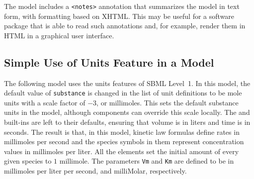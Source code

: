 \documentclass[10pt]{cekarticle}
\newcommand{\changed}[1]{\textcolor{BrickRed}{#1}}
\begin{document}
The model includes a \texttt{<notes>} annotation that summarizes the model
in text form, with formatting based on XHTML.  This may be useful for a
software package that is able to read such annotations and, for example,
render them in HTML in a graphical user interface.


\subsection{Simple Use of Units Feature in a Model}
\label{apdx:units-eg}

The following model uses the units features of SBML Level~1.  In this
model, the default value of \texttt{substance} is changed in the list of
unit definitions to be mole units with a scale factor of $-3$, or
millimoles.  This sets the default substance units in the model,
\changed{although} components can override this scale locally.  The
 and  built-ins are left to their defaults,
ensuring that volume is in liters and time is in seconds.  The result is
that, in this model, kinetic law formulas define rates in millimoles per
second and the \changed{species} symbols in them represent concentration
values in millimoles per liter.  All the \changed{} elements
set the initial amount of every given \changed{species} to $1$ millimole.
The parameters \texttt{Vm} and \texttt{Km} are defined to be in millimoles
per liter per second, and milliMolar, respectively.
\end{document}
